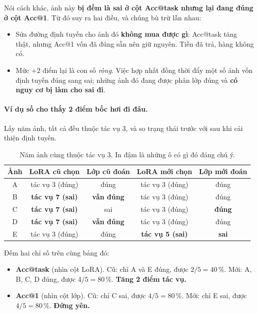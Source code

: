 \documentclass[11pt,a4paper]{article}
\begin{document}
Nói cách khác, ảnh này \textbf{bị đếm là sai ở cột Acc@task nhưng lại đang đúng ở
cột Acc@1}. Từ đó suy ra hai điều, và chúng bù trừ lẫn nhau:

\begin{itemize}
\item Sửa đường định tuyến cho ảnh đó \textbf{không mua được gì}: Acc@task tăng
      thật, nhưng Acc@1 vốn đã đúng sẵn nên giữ nguyên. Tiền đã trả, hàng không có.
\item Mức $+2$ điểm lại là con số \emph{ròng}. Việc hợp nhất đồng thời đẩy một số
      ảnh vốn định tuyến đúng sang sai; những ảnh đó đang được phân lớp đúng và
      \textbf{có nguy cơ bị làm cho sai đi}.
\end{itemize}

\paragraph{Ví dụ số cho thấy 2 điểm bốc hơi đi đâu.}
Lấy năm ảnh, tất cả đều thuộc tác vụ 3, và so trạng thái trước với sau khi cải
thiện định tuyến.

\begin{table}[htbp]
\centering
\caption{Năm ảnh cùng thuộc tác vụ 3. In đậm là những ô có gì đó đáng chú ý.}
\label{tab:vidu-phat-hien-2}
\begin{tabular}{ccccc}
\toprule
Ảnh & LoRA cũ chọn & Lớp cũ đoán & LoRA mới chọn & Lớp mới đoán \\
\midrule
A & tác vụ 3 (đúng) & đúng            & tác vụ 3 (đúng) & đúng \\
B & \textbf{tác vụ 7 (sai)} & \textbf{vẫn đúng} & tác vụ 3 (đúng) & đúng \\
C & \textbf{tác vụ 7 (sai)} & sai     & tác vụ 3 (đúng) & \textbf{đúng} \\
D & \textbf{tác vụ 7 (sai)} & \textbf{vẫn đúng} & tác vụ 3 (đúng) & đúng \\
E & tác vụ 3 (đúng) & đúng            & \textbf{tác vụ 5 (sai)} & \textbf{sai} \\
\bottomrule
\end{tabular}
\end{table}

Đếm hai chỉ số trên cùng bảng đó:

\begin{itemize}
\item \textbf{Acc@task} (nhìn cột LoRA). Cũ: chỉ A và E đúng, được $2/5 = 40\,\%$.
      Mới: A, B, C, D đúng, được $4/5 = 80\,\%$. \textbf{Tăng 2 điểm tác vụ.}
\item \textbf{Acc@1} (nhìn cột lớp). Cũ: chỉ C sai, được $4/5 = 80\,\%$.
      Mới: chỉ E sai, được $4/5 = 80\,\%$. \textbf{Đứng yên.}
\end{itemize}
\end{document}
